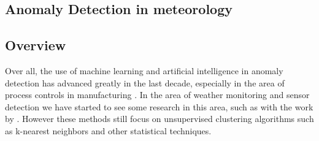 \subsection{Anomaly Detection in meteorology}

\subsection{Overview}

Over all, the use of machine learning and artificial intelligence in anomaly detection has advanced greatly in the last decade, especially in the area of process controls in manufacturing \cite{venkatasubramanianReviewProcessFault2003}.  In the area of weather monitoring and sensor detection we have started to see some research in this area, such as with the work by \citet{onalWeatherDataAnalysis2017a}.  However these methods still focus on unsupervised clustering algorithms such as k-nearest neighbors and other statistical techniques.
